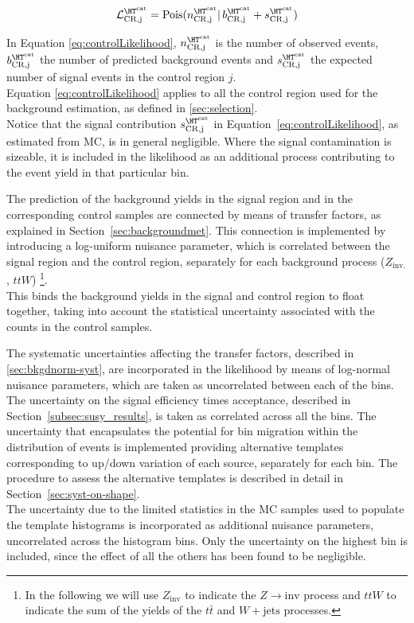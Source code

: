 \begin{equation}
\mathcal{L}^{\htcat}_{\mathrm{CR,j}}=\mathrm{Pois}(n^{\htcat}_{\mathrm{CR,j}} |\, b^{\htcat}_{\mathrm{CR,j}} + s^{\htcat}_{\mathrm{CR,j}})
\label{eq:controlLikelihood}
\end{equation}

In Equation \ref{eq:controlLikelihood}, $n^{\htcat}_{\mathrm{CR,j}}$ is the number of observed events, $b^{\htcat}_{\mathrm{CR,j}}$ the number of predicted 
background events and $s^{\htcat}_{\mathrm{CR,j}}$ the expected number of signal events in the control region $j$. \\
Equation \ref{eq:controlLikelihood} applies to all the control region used for the background estimation, 
as defined in \ref{sec:selection}. \\
Notice that the signal contribution $s^{\htcat}_{\mathrm{CR,j}}$ in Equation~\ref{eq:controlLikelihood}, as estimated from MC, is in general negligible. 
Where the signal contamination is sizeable, it is included in the likelihood as an additional process contributing to the event yield in that particular bin.

The prediction of the background yields in the signal region and in the corresponding control samples are connected 
by means of transfer factors, as explained in Section~\ref{sec:backgroundmet}. 
This connection is implemented by introducing a log-uniform nuisance parameter, which is correlated 
between the signal region and the control region, separately for each background process ($Z_{\mathrm{inv.}}$, $ttW$) \footnote{In the following we will use $Z_{\mathrm{inv}}$ to indicate the $Z\to \mathrm{inv}$ process and $ttW$ to indicate the sum of the yields of the $t\bar{t}$ and $W+\mathrm{jets}$ processes.}. \\
This binds the background yields in the signal and control region to float together, 
taking into account the statistical uncertainty associated with the counts in the control samples. 

The systematic uncertainties affecting the transfer factors, described in \ref{sec:bkgdnorm-syst}, 
are incorporated in the likelihood by means of log-normal nuisance parameters, 
which are taken as uncorrelated between each of the \htcat bins.
The uncertainty on the signal efficiency times acceptance, described in Section~\ref{subsec:susy_results}, is taken as correlated across all the \htcat bins. 
The uncertainty that encapsulates the potential for bin migration within the \mht distribution of events is implemented providing alternative templates corresponding to up/down variation of each source, separately for each \htcat bin. The procedure to assess the alternative templates is described in detail in Section~\ref{sec:syst-on-shape}. \\
The uncertainty due to the limited statistics in the MC samples used to populate the template histograms is incorporated 
as additional nuisance parameters, uncorrelated across the histogram bins. 
Only the uncertainty on the highest \mht bin is included, since the effect of all the others has been found to be negligible.

